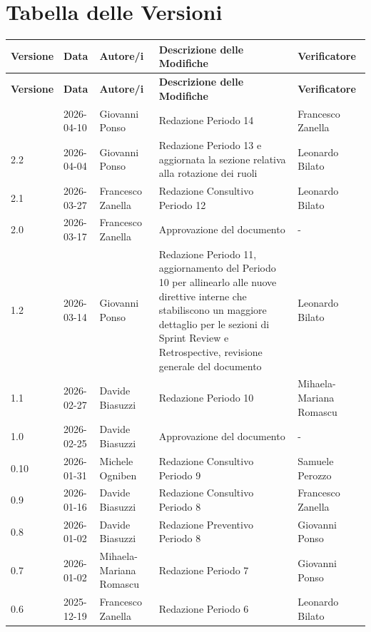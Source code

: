 \documentclass[a4paper, 11pt, oneside]{scrartcl} %
\begin{document}
\section*{Tabella delle Versioni}
\vspace{0.2cm}
{%
\renewcommand{\arraystretch}{1.2}
\setlength{\LTleft}{-0.4cm}
\setlength{\LTright}{0pt}
\begin{longtable}{@{}llp{}p{}p{}@{}}
    \toprule
    \textbf{Versione} & \textbf{Data} & \textbf{Autore/i} & \textbf{Descrizione delle Modifiche} & \textbf{Verificatore} \\
    \midrule
    \endfirsthead
    \toprule
    \textbf{Versione} & \textbf{Data} & \textbf{Autore/i} & \textbf{Descrizione delle Modifiche} & \textbf{Verificatore} \\
    \midrule
    \endhead
    \bottomrule
    \endfoot
    \bottomrule
    \endlastfoot
2.3 & 2026-04-10 & Giovanni Ponso & Redazione Periodo 14 & Francesco Zanella \\
2.2 & 2026-04-04 & Giovanni Ponso & Redazione Periodo 13 e aggiornata la sezione relativa alla rotazione dei ruoli & Leonardo Bilato \\
2.1 & 2026-03-27 & Francesco Zanella & Redazione Consultivo Periodo 12 & Leonardo Bilato \\
2.0 & 2026-03-17 & Francesco Zanella & Approvazione del documento & - \\
1.2 & 2026-03-14 & Giovanni Ponso & Redazione Periodo 11, aggiornamento del Periodo 10 per allinearlo alle nuove direttive interne che stabiliscono un maggiore dettaglio per le sezioni di Sprint Review e Retrospective, revisione generale del documento & Leonardo Bilato \\
1.1 & 2026-02-27 & Davide Biasuzzi & Redazione Periodo 10 & Mihaela-Mariana Romascu \\
1.0 & 2026-02-25 & Davide Biasuzzi & Approvazione del documento & - \\
0.10 & 2026-01-31 & Michele Ogniben & Redazione Consultivo Periodo 9 & Samuele Perozzo \\
0.9 & 2026-01-16 & Davide Biasuzzi & Redazione Consultivo Periodo 8 & Francesco Zanella \\
0.8 & 2026-01-02 & Davide Biasuzzi & Redazione Preventivo Periodo 8 & Giovanni Ponso \\
0.7 & 2026-01-02 & Mihaela-Mariana Romascu & Redazione Periodo 7 & Giovanni Ponso \\
0.6 & 2025-12-19 & Francesco Zanella & Redazione Periodo 6 & Leonardo Bilato \\

\end{longtable}}
\end{document}
